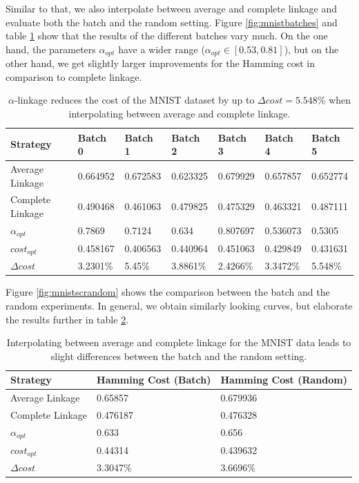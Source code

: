 Similar to that, we also interpolate between average and complete linkage and evaluate both the batch and the random setting. Figure \ref{fig:mnistbatches} and table \ref{table:mnist1000acbatch} show that the results of the different batches vary much. On the one hand, the parameters $\alpha_{opt}$ have a wider range ($\alpha_{opt} \in [0.53,0.81]$), but on the other hand, we get slightly larger improvements for the Hamming cost in comparison to complete linkage.

\begin{table}[h]
    \centering
    \begin{tabular}{|l | l l l l l l |}
    \hline
    Strategy & Batch 0 & Batch 1 & Batch 2 & Batch 3 & Batch 4 & Batch 5\\ \hline
    Average Linkage & 0.664952 & 0.672583 & 0.623325 & 0.679929 & 0.657857 & 0.652774\\
    Complete Linkage & 0.490468 & 0.461063 & 0.479825 & 0.475329 & 0.463321 & 0.487111\\
    $\alpha_{opt}$ & 0.7869 & 0.7124 & 0.634 & 0.807697 & 0.536073 & 0.5305\\
    $cost_{opt}$ & 0.458167 & 0.406563 & 0.440964 & 0.451063 & 0.429849 & 0.431631\\
    $\Delta cost$ & 3.2301\% & 5.45\% & 3.8861\% & 2.4266\% & 3.3472\% & 5.548\%\\\hline
    \end{tabular}
    \caption{$\alpha$-linkage reduces the cost of the MNIST dataset by up to $\Delta cost = 5.548\%$ when interpolating between average and complete linkage.}
    \label{table:mnist1000acbatch}
\end{table}

Figure \ref{fig:mnistscrandom} shows the comparison between the batch and the random experiments. In general, we obtain similarly looking curves, but elaborate the results further in table \ref{table:mnistacavg}.

\begin{table}[h]
    \centering
    \begin{tabular}{|l | l | l |}
    \hline
    Strategy & Hamming Cost (Batch) & Hamming Cost (Random)\\ \hline
    Average Linkage & 0.65857 & 0.679936\\
    Complete Linkage & 0.476187 & 0.476328\\
    $\alpha_{opt}$ & 0.633 & 0.656\\
    $cost_{opt}$ & 0.44314 & 0.439632\\
    $\Delta cost$ & 3.3047\% & 3.6696\%\\\hline
    \end{tabular}
    \caption{Interpolating between average and complete linkage for the MNIST data leads to slight differences between the batch and the random setting.}
    \label{table:mnistacavg}
\end{table}

